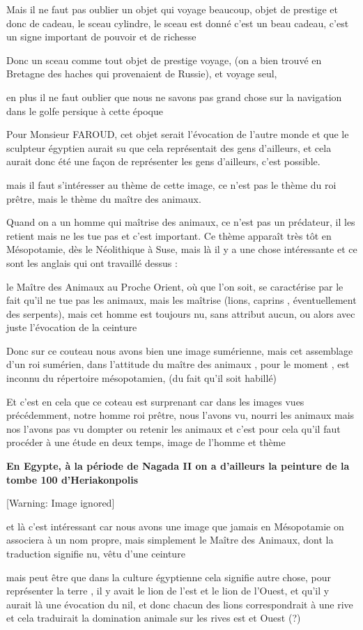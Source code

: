 \documentclass[a4paper,10pt]{article}
\newcommand{\DirImg}{../img/FaivreMartin/}
\begin{document}
Mais il ne faut pas oublier un objet qui voyage beaucoup, objet de
prestige et donc de cadeau, le sceau cylindre, le sceau est donné
c'est un beau cadeau, c'est un signe
important de pouvoir et de richesse

Donc un sceau comme tout objet de prestige voyage, (on a bien trouvé en
Bretagne des haches qui provenaient de Russie), et voyage seul, 

en plus il ne faut oublier que nous ne savons pas grand chose sur la
navigation dans le golfe persique à cette époque

Pour Monsieur FAROUD, cet objet serait l'évocation de
l'autre monde et que le sculpteur égyptien aurait su
que cela représentait des gens d'ailleurs,  et cela
aurait donc été une façon de représenter les gens
d'ailleurs, c'est possible.

mais il faut s'intéresser au thème de cette image, ce
n'est pas le thème du roi prêtre, mais le thème du
maître des animaux.

Quand on a un homme qui maîtrise des animaux, ce n'est
pas un prédateur, il les retient mais ne les tue pas et
c'est important. Ce thème apparaît très tôt en
Mésopotamie, dès le Néolithique à Suse, mais là il y a une chose
intéressante et ce sont les anglais qui ont travaillé dessus : 

le Maître des Animaux au Proche Orient, où que l'on
soit, se caractérise par le fait qu'il ne tue pas les
animaux,  mais les maîtrise (lions, caprins , éventuellement des
serpents), mais cet homme est toujours nu, sans attribut aucun, ou
alors avec juste l'évocation de la ceinture 

Donc sur ce couteau nous avons bien une image sumérienne, mais cet
assemblage d'un roi sumérien, dans
l'attitude du maître des animaux , pour le moment ,
est inconnu du répertoire mésopotamien, (du fait qu'il
soit habillé)

Et c'est en cela que ce coteau est surprenant car dans 
les images vues précédemment, notre homme roi prêtre, nous 
l'avons vu, nourri les animaux mais nos 
l'avons pas vu dompter ou retenir les animaux et 
c'est pour cela qu'il faut procéder à 
une étude en deux temps, image de l'homme et thème

\textbf{En Egypte, à la période de Nagada II on a 
d'ailleurs la peinture de la tombe 100 
d'Heriakonpolis}

  [Warning: Image ignored] %
 

et là c'est intéressant car nous avons une image que 
jamais en Mésopotamie on associera à un nom propre, mais simplement le 
Maître des Animaux, dont la traduction signifie nu, vêtu 
d'une ceinture 

mais peut être que dans la culture égyptienne cela signifie autre chose, 
pour représenter la terre , il y avait le lion de 
l'est et le lion de l'Ouest, et 
qu'il y aurait là une évocation du nil, et donc chacun 
des lions correspondrait à une rive et cela traduirait la domination 
animale sur les rives est et Ouest (?)

\end{document}
